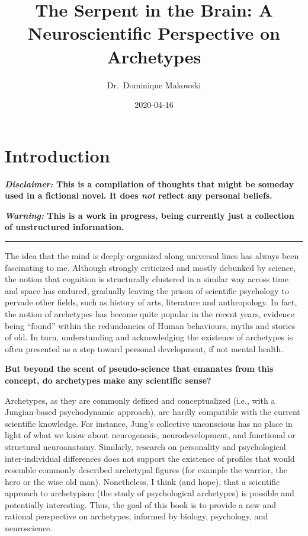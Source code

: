 \documentclass[
]{book}
\title{The Serpent in the Brain: A Neuroscientific Perspective on Archetypes}
\author{Dr.~Dominique Makowski}
\date{2020-04-16}
\begin{document}
\maketitle

{
\setcounter{tocdepth}{1}
\tableofcontents
}
\hypertarget{introduction}{%
\chapter{Introduction}\label{introduction}}

\textbf{\emph{Disclaimer:} This is a compilation of thoughts that might be someday used in a fictional novel. It does \emph{not} reflect any personal beliefs.}

\textbf{\emph{Warning:} This is a work in progress, being currently just a collection of unstructured information.}

\begin{center}\rule{0.5\linewidth}{0.5pt}\end{center}

The idea that the mind is deeply organized along universal lines has always been fascinating to me. Although strongly criticized and mostly debunked by science, the notion that cognition is structurally clustered in a similar way across time and space has endured, gradually leaving the prison of scientific psychology to pervade other fields, such as history of arts, literature and anthropology. In fact, the notion of archetypes has become quite popular in the recent years, evidence being ``found'' within the redundancies of Human behaviours, myths and stories of old. In turn, understanding and acknowledging the existence of archetypes is often presented as a step toward personal development, if not mental health.

\textbf{But beyond the scent of pseudo-science that emanates from this concept, do archetypes make any scientific sense?}

Archetypes, as they are commonly defined and conceptualized (i.e., with a Jungian-based psychodynamic approach), are hardly compatible with the current scientific knowledge. For instance, Jung's collective unconscious has no place in light of what we know about neurogenesis, neurodevelopment, and functional or structural neuroanatomy. Similarly, research on personality and psychological inter-individual differences does not support the existence of profiles that would resemble commonly described archetypal figures (for example the warrior, the hero or the wise old man). Nonetheless, I think (and hope), that a scientific approach to archetypism (the study of psychological archetypes) is possible and potentially interesting. Thus, the goal of this book is to provide a new and rational perspective on archetypes, informed by biology, psychology, and neuroscience.
\end{document}

